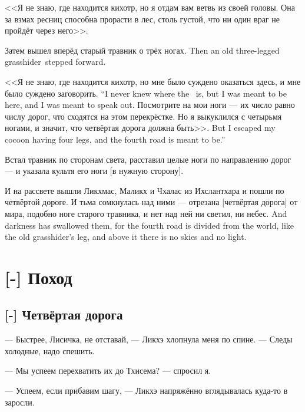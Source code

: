 <<Я не знаю, где находится кихотр, но я отдам вам ветвь из своей головы.
Она за взмах ресниц способна прорасти в лес, столь густой, что ни один враг не пройдёт через него>>.

{Затем вышел вперёд старый травник о трёх ногах\FM.}
{Then an old three-legged grasshider\FM\ stepped forward.}

{<<Я не знаю, где находится кихотр, но мне было суждено оказаться здесь, и мне было суждено заговорить.}
{``I never knew where the \Kihotr\ is, but I was meant to be here, and I was meant to speak out.}
Посмотрите на мои ноги --- их число равно числу дорог, что сходятся на этом перекрёстке.
{Но я выкуклился с четырьмя ногами, и значит, что четвёртая дорога должна быть>>.}
{But I escaped my cocoon having four legs, and the fourth road is meant to be.''}

Встал травник по сторонам света, расставил целые ноги по направлению дорог --- и указала культя его ноги [в нужную сторону].

И на рассвете вышли Ликхмас, Маликх и Чхалас из Ихслантхара и пошли по четвёртой дороге\FM.
{И тьма сомкнулась над ними --- отрезана [четвёртая дорога] от мира, подобно ноге старого травника, и нет над ней ни светил, ни небес.}
{And darkness has swallowed them, for the fourth road is divided from the world, like the old grasshider's leg, and above it there is no skies and no light.}

\chapter{[-] Поход}

\section{[-] Четвёртая дорога}

--- Быстрее, Лисичка, не отставай, --- Ликхэ хлопнула меня по спине.
--- Следы холодные, надо спешить.

--- Мы успеем перехватить их до Тхисема? --- спросил я.

--- Успеем, если прибавим шагу, --- Ликхэ напряжённо вглядывалась куда-то в заросли.

